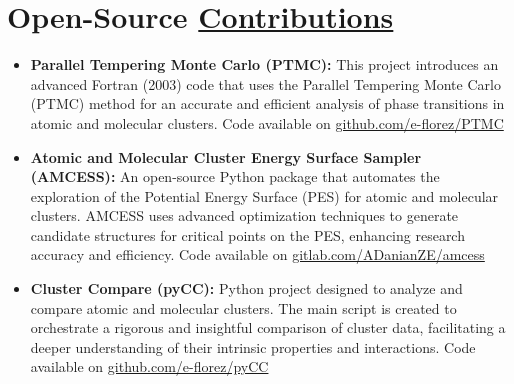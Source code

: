 \section{Open-Source \href{.}{Contributions}}

\begin{itemize}
    \small
    \item \textbf{Parallel Tempering Monte Carlo (PTMC):}
          This project introduces an advanced Fortran (2003) code that uses the Parallel Tempering Monte Carlo (PTMC) method for an accurate and efficient analysis of phase transitions in atomic and molecular clusters. Code available on \href{https://github.com/e-florez/PTMC}{github.com/e-florez/PTMC}

    \item \textbf{Atomic and Molecular Cluster Energy Surface Sampler (AMCESS):}
          An open-source Python package that automates the exploration of the Potential Energy Surface (PES) for atomic and molecular clusters. AMCESS uses advanced optimization techniques to generate candidate structures for critical points on the PES, enhancing research accuracy and efficiency. Code available on \href{https://gitlab.com/ADanianZE/amcess}{gitlab.com/ADanianZE/amcess}

    \item \textbf{Cluster Compare (pyCC):}
          Python project designed to analyze and compare atomic and molecular clusters. The main script is created to orchestrate a rigorous and insightful comparison of cluster data, facilitating a deeper understanding of their intrinsic properties and interactions. Code available on \href{https://github.com/e-florez/pyCC}{github.com/e-florez/pyCC}

\end{itemize}